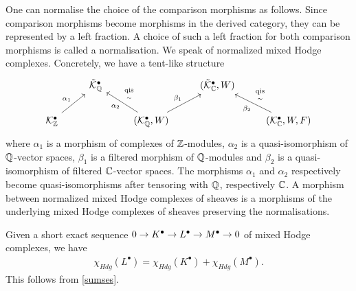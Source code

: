 \documentclass[../main.tex]{subfiles}
\begin{document}
\begin{rem}
    One can normalise the choice of the comparison morphisms as
follows. Since comparison morphisms become morphisms in the derived category, they can be represented by a left fraction. A choice of such a left fraction for both comparison morphisms is called a normalisation. We speak of normalized mixed Hodge complexes. Concretely, we have a tent-like structure
\[
\begin{tikzcd}
    & \tilde{\calK}_\QQ^\bullet  &   &  (\tilde{\calK}_\CC^\bullet, W)  &  \\
  \calK_\ZZ^\bullet \arrow{ru}{\alpha_1} &  & (\calK_\QQ^\bullet, W)  \arrow{ru}{\beta_1} \arrow{lu}{\alpha_2}[swap]{\underset{\sim}{\qis}}  & &  (\calK_\CC^\bullet, W, F) \arrow{lu}{\beta_2}[swap]{\underset{\sim}{\qis}}
\end{tikzcd}
\]
where $\alpha_1$ is a morphism of complexes of $\mathbb{Z}$-modules, $\alpha_2$ is a quasi-isomorphism of $\mathbb{Q}$-vector spaces, $\beta_1$ is a filtered morphism of $\mathbb{Q}$-modules and $\beta_2$ is
a quasi-isomorphism of filtered $\mathbb{C}$-vector spaces. The morphisms $\alpha_1$ and $\alpha_2$ respectively become quasi-isomorphisms after tensoring with $\mathbb{Q}$, respectively $\mathbb{C}$. A morphism between normalized mixed Hodge complexes of sheaves is a
morphisms of the underlying mixed Hodge complexes of sheaves preserving the normalisations.
\end{rem} 



\begin{rem}
    Given a short exact sequence $0 \to K^\bullet \to L^\bullet \to M^\bullet \to 0$ of mixed Hodge complexes, we have 
    \begin{align} \label{Hdg-characteristic-SES}
        \chi_{Hdg}(L^\bullet)= \chi_{Hdg}(K^\bullet) + \chi_{Hdg}(M^\bullet).
    \end{align}
    This follows from \eqref{sumses}.
\end{rem}
\end{document}
